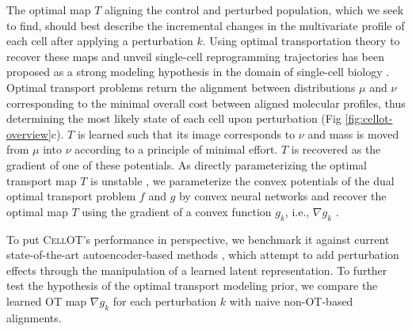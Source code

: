 The optimal map $T$ aligning the control and perturbed population, which we seek to find, should best describe the incremental changes in the multivariate profile of each cell after applying a perturbation $k$.
Using optimal transportation theory \cite{villani2003, santambrogio2015} to recover these maps and unveil single-cell reprogramming trajectories has been proposed as a strong modeling hypothesis in the domain of single-cell biology \cite{schiebinger2019, cang2020, demetci2022, huizing2022, lavenant2023, zhang2021}.
Optimal transport problems return the alignment between distributions $\mu$ and $\nu$ corresponding to the minimal overall cost between aligned molecular profiles, thus determining the most likely state of each cell upon perturbation (Fig \ref{fig:cellot-overview}c).
$T$ is learned such that its image corresponds to $\nu$ and mass is moved from $\mu$ into $\nu$ according to a principle of minimal effort.
$T$ is recovered as the gradient of one of these potentials.
As directly parameterizing the optimal transport map $T$ 
\cite{korotin2020, yang2019, prasad2022} is unstable \citep[Table 1]{makkuva2020}, we parameterize the convex potentials of the dual optimal transport problem $f$ and $g$ by convex neural networks \cite{amos2017} and recover the optimal map $T$ using the gradient of a convex function $g_k$, i.e., $\nabla g_k$ \cite{makkuva2020}.

To put \textsc{CellOT}'s performance in perspective, we benchmark it against current state-of-the-art autoencoder-based methods \cite{lotfollahi2019, lopez2018},
which attempt to add perturbation effects through the manipulation of a learned latent representation.
To further test the hypothesis of the optimal transport modeling prior, we compare the learned OT map $\nabla g_k$ for each perturbation $k$ with naive non-OT-based alignments.


